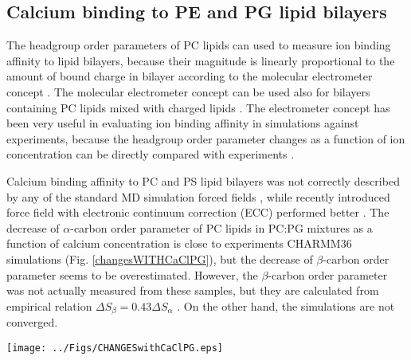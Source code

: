 \documentclass[aps,prl,superscriptaddress,twocolumn]{revtex4}
\begin{document}
\clearpage
\subsection{Calcium binding to PE and PG lipid bilayers}
The headgroup order parameters of PC lipids can used to measure ion binding
affinity to lipid bilayers, because their magnitude is linearly proportional
to the amount of bound charge in bilayer according to the molecular
electrometer concept \cite{seelig87,catte16}. The molecular electrometer concept
can be used also for bilayers containing PC lipids mixed with charged
lipids \cite{borle85,macdonald87,roux90,antila19}.
The electrometer concept has been very useful in evaluating ion binding affinity in simulations
against experiments, because the headgroup order parameter changes as a function of ion concentration
can be directly compared with experiments \cite{catte16,melcr18,antila19}.

Calcium binding affinity to PC and PS lipid bilayers was not correctly described by
any of the standard MD simulation forced fields \cite{catte16,antila19}, while
recently introduced force field with electronic continuum correction (ECC) performed better \cite{melcr18}.
The decrease of $\alpha$-carbon order parameter of PC lipids in PC:PG mixtures as a function
of calcium concentration is close to experiments CHARMM36 simulations (Fig. \ref{changesWITHCaClPG}),
but the decrease of $\beta$-carbon order parameter seems to be overestimated.
However, the $\beta$-carbon order parameter was not actually measured from these samples,
but they are calculated from empirical relation $\Delta S_{\beta}=0.43\Delta S_{\alpha}$ \cite{akutsu81}.
On the other hand, the simulations are not converged.
\begin{figure*}[]
  \centering
  \texttt{[image: ../Figs/CHANGESwithCaClPG.eps]}
  \caption{\label{changesWITHCaClPG}
    (left) The headgroup order parameters of PC from PC:PG mixtures as a function CaCl$_2$
    concentration from experiments \cite{borle85,macdonald87} and CHARMM36 simulations.
    Note that beta order parameter is calculated from empirical relation $\Delta S_{\beta}=0.43\Delta S_{\alpha}$ \cite{akutsu81}, not actually measured.
    (right) The headgroup order parameters of PG from PC:PG mixtures as a function CaCl$_2$
    concentration from experiments \cite{borle85} and CHARMM36 simulations.
  }
\end{figure*}
\end{document}
